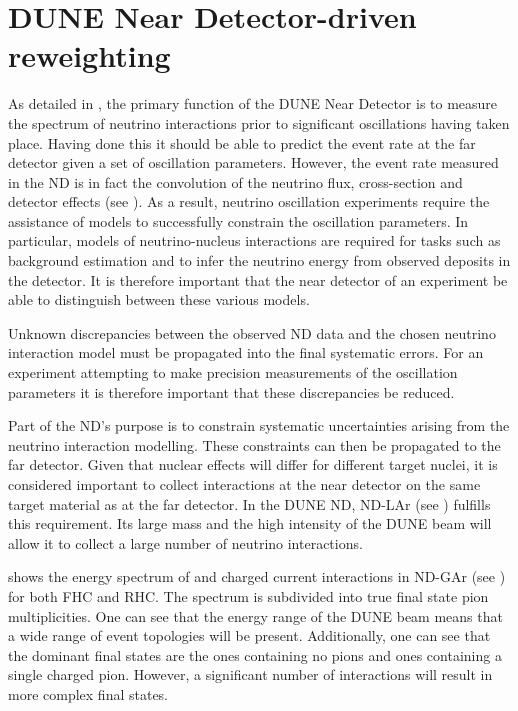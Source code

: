 \chapter{DUNE Near Detector-driven reweighting}
\label{sec:dune_ndrwt}

As detailed in , the primary function of the DUNE Near Detector is to measure the spectrum of neutrino interactions prior to significant oscillations having taken place.
Having done this it should be able to predict the event rate at the far detector given a set of oscillation parameters.
However, the event rate measured in the ND is in fact the convolution of the neutrino flux, cross-section and detector effects (see ).
As a result, neutrino oscillation experiments require the assistance of models to successfully constrain the oscillation parameters.
In particular, models of neutrino-nucleus interactions are required for tasks such as background estimation and to infer the neutrino energy from observed deposits in the detector.
It is therefore important that the near detector of an experiment be able to distinguish between these various models.

Unknown discrepancies between the observed ND data and the chosen neutrino interaction model must be propagated into the final systematic errors.
For an experiment attempting to make precision measurements of the oscillation parameters it is therefore important that these discrepancies be reduced.

Part of the ND's purpose is to constrain systematic uncertainties arising from the neutrino interaction modelling.
These constraints can then be propagated to the far detector.
Given that nuclear effects will differ for different target nuclei, it is considered important to collect interactions at the near detector on the same target material as at the far detector.
In the DUNE ND, ND-LAr (see ) fulfills this requirement.
Its large mass and the high intensity of the DUNE beam will allow it to collect a large number of neutrino interactions.


 shows the energy spectrum of \numu and \anumu charged current interactions in ND-GAr (see ) for both FHC and RHC.
The spectrum is subdivided into true final state pion multiplicities. 
One can see that the energy range of the DUNE beam means that a wide range of event topologies will be present.
Additionally, one can see that the dominant final states are the ones containing no pions and ones containing a single charged pion.
However, a significant number of interactions will result in more complex final states.

